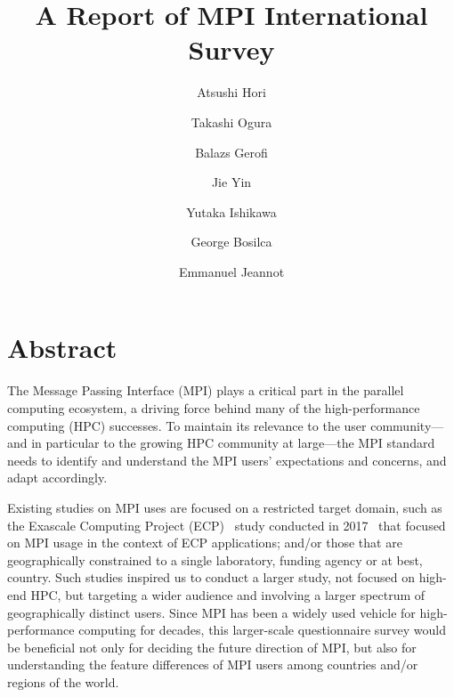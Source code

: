 \documentclass[sigconf,nonacm]{acmart}
\begin{document}
\title{A Report of MPI International Survey}

\author{Atsushi Hori}
\author{Takashi Ogura}
\author{Balazs Gerofi}
\author{Jie Yin}
\author{Yutaka Ishikawa}

\author{George Bosilca}

\author{Emmanuel Jeannot}

\maketitle

\section{Abstract}

The Message Passing Interface (MPI) plays a critical part in the
parallel computing ecosystem, a driving force behind many of the
high-performance computing (HPC) successes. To maintain its relevance
to the user community---and in particular to the growing HPC community
at large---the MPI standard needs to identify and understand the MPI
users' expectations and concerns, and adapt accordingly.

%
Existing studies on MPI uses are focused on a restricted target domain,
such as the Exascale Computing Project (ECP)~\cite{ECP} study
conducted in 2017~\cite{osti_1462877} that focused 
on MPI usage in the context of ECP applications; and/or those that are
geographically 
constrained to a single laboratory, funding agency or at best, country.
%
Such studies inspired us to conduct a larger study, not focused on
high-end HPC, but targeting a wider audience and involving a larger
spectrum of geographically distinct users. Since MPI has been a widely
used vehicle for high-performance computing for decades, this
larger-scale questionnaire survey would be beneficial not only for
deciding the future direction of MPI, but also for understanding the
feature differences of MPI users among countries and/or regions of the
world.
\end{document}
